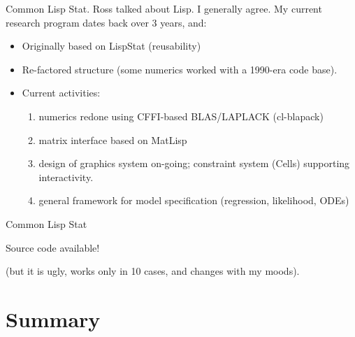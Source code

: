 \documentclass{beamer}
\begin{document}
\begin{frame}{Common Lisp Stat.}
  Ross talked about Lisp.   I generally agree.  My current
  research program dates back over 3 years, and:
  \begin{itemize}
  \item Originally based on LispStat (reusability)
  \item Re-factored structure (some numerics worked with a 1990-era code base). 
  \item Current activities:
    \begin{enumerate}
    \item numerics redone using CFFI-based BLAS/LAPLACK (cl-blapack)
    \item matrix interface based on MatLisp
    \item design of graphics system on-going; constraint system
      (Cells) supporting interactivity.
    \item general framework for model specification (regression,
      likelihood, ODEs)
    \end{enumerate}
  \end{itemize}
\end{frame}

\begin{frame}{Common Lisp Stat}

  Source code available!

  (but it is ugly, works only in 10 cases, and changes with my moods).
  
\end{frame}
\section*{Summary}

\end{document}

